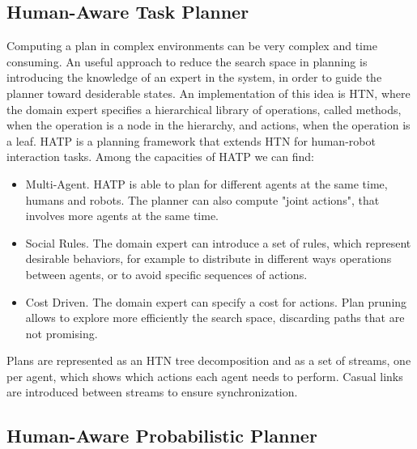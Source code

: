 \subsection{Human-Aware Task Planner}
Computing a plan in complex environments can be very complex and time consuming. An useful approach to reduce the search space in planning is introducing the knowledge of an expert in the system, in order to guide the planner toward desiderable states. An implementation of this idea is HTN, where the domain expert specifies a hierarchical library of operations, called methods, when the operation is a node in the hierarchy, and actions, when the operation is a leaf. HATP is a planning framework that extends HTN for human-robot interaction tasks. Among the capacities of HATP we can find:
\begin{itemize}
\item Multi-Agent. HATP is able to plan for different agents at the same time, humans and robots. The planner can also compute "joint actions", that involves more agents at the same time.
\item Social Rules. The domain expert can introduce a set of rules, which represent desirable behaviors, for example to distribute in different ways operations between agents, or to avoid specific sequences of actions.
\item Cost Driven. The domain expert can specify a cost for actions. Plan pruning allows to explore more efficiently the search space, discarding paths that are not promising.
\end{itemize} 

Plans are represented as an HTN tree decomposition and as a set of streams, one per agent, which shows which actions each agent needs to perform. Casual links are introduced between streams to ensure synchronization.

\subsection{Human-Aware Probabilistic Planner}
\label{subsec-plan_management_happ}



